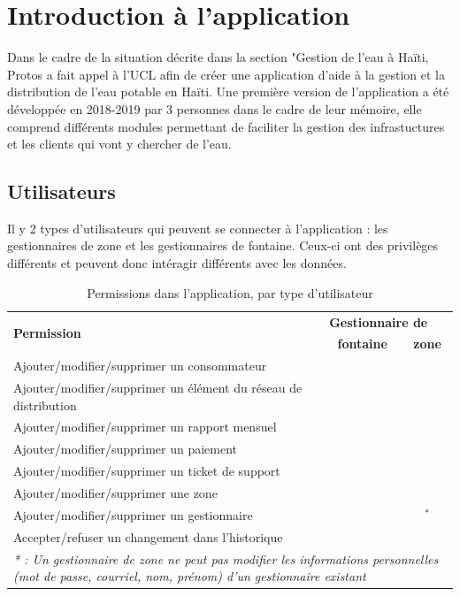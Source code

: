 \documentclass{EPL-master-thesis-covers-FR}
\newcommand{\cmark}{\ding{51}}%
\newcommand{\xmark}{\ding{55}}%
\begin{document}
		\section{Introduction à l'application}
				Dans le cadre de la situation décrite dans la section "Gestion de l'eau à Haïti, Protos a fait appel à l'UCL afin de créer une application d'aide à la gestion et la distribution de l'eau potable en Haïti. Une première version de l'application a été développée en 2018-2019 par 3 personnes dans le cadre de leur mémoire, elle comprend différents modules permettant de faciliter la gestion des infrastuctures et les clients qui vont y chercher de l'eau.
				
			\subsection{Utilisateurs}
				Il y 2 types d'utilisateurs qui peuvent se connecter à l'application : les gestionnaires de zone et les gestionnaires de fontaine. Ceux-ci ont des privilèges différents et peuvent donc intéragir différents avec les données.
				\begin{table}[H]
					\centering
					\small
					\setlength\tabcolsep{2pt}
					\begin{tabular}{|l|c|c|}
						\hline
						\multirow{2}{*}{\textbf{Permission}} & \multicolumn{2}{l|}{\textbf{Gestionnaire de}} \\ \cline{2-3}
						 & \textbf{fontaine} & \textbf{zone} \\ \hline
						 Ajouter/modifier/supprimer un consommateur & \cmark & \cmark \\ \hline
						 Ajouter/modifier/supprimer un élément du réseau de distribution & \cmark & \cmark \\ \hline
						 Ajouter/modifier/supprimer un rapport mensuel & \cmark & \cmark \\ \hline
						 Ajouter/modifier/supprimer un paiement & \cmark & \cmark \\ \hline
						 Ajouter/modifier/supprimer un ticket de support & \cmark & \cmark \\ \hline
						 Ajouter/modifier/supprimer une zone & \xmark & \cmark \\ \hline
						 Ajouter/modifier/supprimer un gestionnaire & \xmark & \cmark$^{*}$ \\ \hline
						 Accepter/refuser un changement dans l'historique & \xmark & \cmark \\ \hline
						 \multicolumn{3}{p{\textwidth}}{\emph{* : Un gestionnaire de zone ne peut pas modifier les informations personnelles (mot de passe, courriel, nom, prénom) d'un gestionnaire existant}} \\
					\end{tabular}
					\caption{Permissions dans l'application, par type d'utilisateur}
					\label{tab:permissions}
				\end{table}
				
\end{document}

